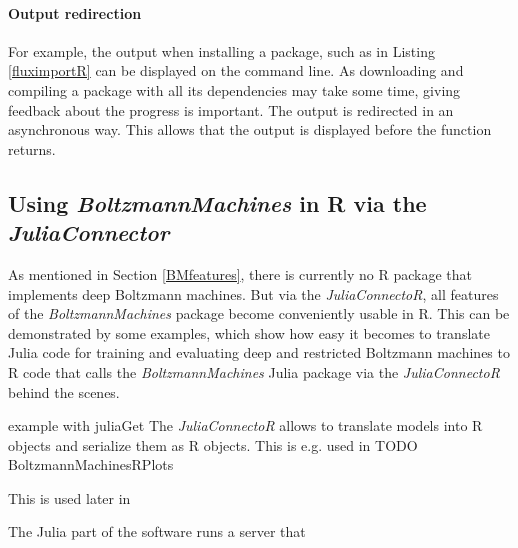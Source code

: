 \documentclass[12pt]{article}
\newcommand{\apkg}[1]{\emph{#1}}
\begin{document}
\paragraph{Output redirection}\label{juliaconnectorOutput}

For example, the output when installing a package, such as in Listing \ref{fluximportR} can be displayed on the command line.
As downloading and compiling a package with all its dependencies may take some time, giving feedback about the progress is important.
The output is redirected in an asynchronous way.
This allows that the output is displayed before the function returns.



\subsection{Using \apkg{BoltzmannMachines} in R via the \apkg{JuliaConnector}}\label{juliaconnectorDbmexample}
As mentioned in Section \ref{BMfeatures}, there is currently no R package that implements deep Boltzmann machines.
But via the \apkg{JuliaConnectoR}, all features of the \apkg{BoltzmannMachines} package become conveniently usable in R.
This can be demonstrated by some examples, which show how easy it becomes to translate Julia code for training and evaluating deep and restricted Boltzmann machines to R code that calls the \apkg{BoltzmannMachines} Julia package via the \apkg{JuliaConnectoR} behind the scenes.



example with juliaGet
The \apkg{JuliaConnectoR} allows to translate models into R objects and serialize them as R objects.
This is e.g. used in TODO BoltzmannMachinesRPlots

This is used later in

 The Julia part of the software runs a server that 

%
%
\end{document}
